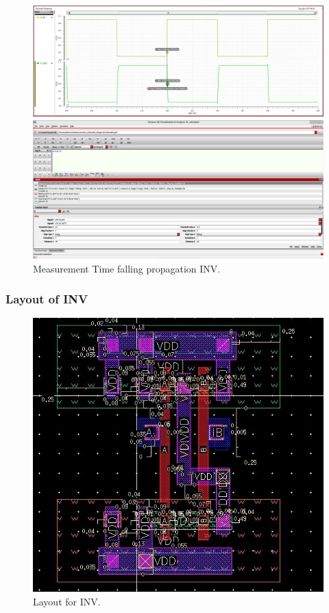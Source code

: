 \begin{figure}[H]
	\begin{minipage}{0.5\linewidth}
		\includegraphics[width=\linewidth]{section/EX1/INV/EX1_INV_Tpdf_Waveform.png}
	\end{minipage}
	\begin{minipage}{0.5\linewidth}
		\includegraphics[width=\linewidth]{section/EX1/INV/EX1_INV_Tpdf_Cal.png}
	\end{minipage}
	\caption{Measurement Time falling propagation INV.}
\end{figure}

\subsubsection{Layout of INV}

\begin{figure}[H]
	\centering
	\includegraphics[width=.7\linewidth]{section/EX1/INV/EX1_INV_layout.png}
	\caption{Layout for INV.}
	\label{f_EX1_INV_layout}
\end{figure}


